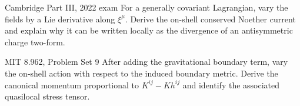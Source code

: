 \begin{exercise}{Cambridge Part III, 2022 exam}
For a generally covariant Lagrangian, vary the fields by a Lie derivative
along \(\xi^\mu\).  Derive the on-shell conserved Noether current and explain
why it can be written locally as the divergence of an antisymmetric charge
two-form.
\end{exercise}

\begin{exercise}{MIT 8.962, Problem Set 9}
After adding the gravitational boundary term, vary the on-shell action with
respect to the induced boundary metric.  Derive the canonical momentum
proportional to \(K^{ij}-Kh^{ij}\) and identify the associated quasilocal
stress tensor.
\end{exercise}
